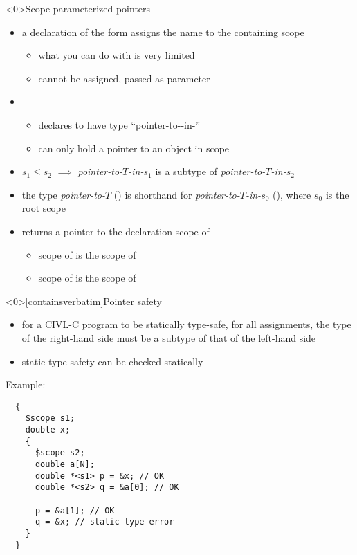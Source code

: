 \documentclass[t]{beamer}
\begin{document}
\begin{frame}<0>{Scope-parameterized pointers}
  \begin{itemize}
  \item a declaration of the form  assigns the name
     to the containing scope
    \begin{itemize}
    \item what you can do with  is very limited
    \item cannot be assigned, passed as parameter
    \end{itemize}
  \item {}
    \begin{itemize}
    \item declares  to have type ``pointer-to--in-''
    \item {} can only hold a pointer to an object in scope 
    \end{itemize}
  \item $s_1\leq s_2$ $\implies$
    \textit{pointer-to-$T$-in-$s_1$} \alert{is a subtype of}
    \textit{pointer-to-$T$-in-$s_2$}
  \item the type \textit{pointer-to-$T$} () is shorthand for
    \textit{pointer-to-$T$-in-$s_0$} (), where $s_0$
    is the \alert{root scope}
  \item {} returns a pointer to the declaration scope of 
    \begin{itemize}
    \item scope of  is the scope of 
    \item scope of  is the scope of 
    \end{itemize}
  \end{itemize}
\end{frame}

\begin{frame}<0>[containsverbatim]{Pointer safety}
  \begin{itemize}
  \item for a CIVL-C program to be \alert{statically type-safe},
    for all assignments, the type of the right-hand side must be a subtype
    of that of the left-hand side
  \item static type-safety can be checked statically
  \end{itemize}
  
  Example:
  
  \begin{mycbox}{7cm}
\begin{verbatim}
  {
    $scope s1;
    double x;
    {
      $scope s2;
      double a[N];
      double *<s1> p = &x; // OK
      double *<s2> q = &a[0]; // OK
      
      p = &a[1]; // OK
      q = &x; // static type error
    }
  }
\end{verbatim}
  \end{mycbox}
\end{frame}
\end{document}
